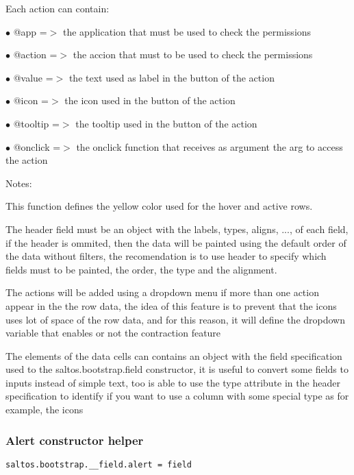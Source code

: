 \documentclass[a4paper]{article}
\begin{document}
Each action can contain:

\begin{compactitem}
\item[\color{myblue}$\bullet$] @app     =$>$ the application that must be used to check the permissions
\item[\color{myblue}$\bullet$] @action  =$>$ the accion that must to be used to check the permissions
\item[\color{myblue}$\bullet$] @value   =$>$ the text used as label in the button of the action
\item[\color{myblue}$\bullet$] @icon    =$>$ the icon used in the button of the action
\item[\color{myblue}$\bullet$] @tooltip =$>$ the tooltip used in the button of the action
\item[\color{myblue}$\bullet$] @onclick =$>$ the onclick function that receives as argument the arg to access the action
\end{compactitem}

Notes:

This function defines the yellow color used for the hover and active rows.

The header field must be an object with the labels, types, aligns, ..., of each field,
if the header is ommited, then the data will be painted using the default order of the
data without filters, the recomendation is to use header to specify which fields must
to be painted, the order, the type and the alignment.

The actions will be added using a dropdown menu if more than one action appear in the
the row data, the idea of this feature is to prevent that the icons uses lot of space
of the row data, and for this reason, it will define the dropdown variable that enables
or not the contraction feature

The elements of the data cells can contains an object with the field specification used
to the saltos.bootstrap.field constructor, it is useful to convert some fields to inputs
instead of simple text, too is able to use the type attribute in the header specification
to identify if you want to use a column with some special type as for example, the icons

\hypertarget{toc634}{}
\subsubsection{Alert constructor helper}

\begin{lstlisting}
saltos.bootstrap.__field.alert = field
\end{lstlisting}
\end{document}
